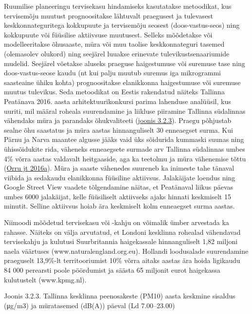 \documentclass[estonian,]{article}
\begin{document}
Ruumilise planeeringu tervisekasu hindamiseks kasutatakse metoodikat, kus tervisemõju muutust prognoositakse lähtuvalt praegusest ja tulevasest keskkonnateguritega kokkupuute ja tervisemõju seosest (doos-vastus-seos) ning kokkupuute või füüsilise aktiivsuse muutusest. Selleks mõõdetakse või modelleeritakse õhusaaste, müra või muu taolise keskkonnateguri tasemed (olemasolev olukord) ning seejärel luuakse erinevate tulevikustsenaariumide mudelid. Seejärel võetakse aluseks praeguse haigestumuse või suremuse tase ning doos-vastus-seose kaudu (nt kui palju muutub suremus iga mikrogrammi saasteaine ühiku kohta) prognoositakse elanikkonna haigestumuse või suremuse muutus tulevikus.
Seda metoodikat on Eestis rakendatud näiteks Tallinna Peatänava 2016. aasta arhitektuurikonkursi parima lahenduse analüüsil, kus uuriti, mil määral roheala suurendamine ja liikluse piiramine Tallinna südalinnas vähendaks müra ja parandaks õhukvaliteeti (\protect\hyperlink{figure323}{joonis 3.2.3}). Praegu põhjustab sealne õhu saastatus ja müra aastas hinnanguliselt 30 enneaegset surma. Kui Pärnu ja Narva maantee algusse jääks vaid üks sõidurida kummaski suunas ning ühissõidukite rida, väheneks enneaegsete surmade arv Tallinna südalinnas umbes 4\% võrra aastas valdavalt heitgaaside, aga ka teetolmu ja müra vähenemise tõttu (\protect\hyperlink{Orru2016}{Orru jt 2016a}). Müra ja saaste vähenedes suureneb ka inimeste tahe tänaval viibida ja sedakaudu elanikkonna füüsiline aktiivsus. Jalakäijate loendus ning Google Street View vaadete tõlgendamine näitas, et Peatänaval liikus päevas umbes 6000 jalakäijat, kelle füüsiliselt aktiivseks ajaks hinnati keskmiselt 15 minutit. Selline aktiivsus hoiab ära keskmiselt kolm enneaegset surma aastas.

Niimoodi mõõdetud tervisekasu või -kahju on võimalik ümber arvestada ka rahasse. Näiteks on välja arvutatud, et Londoni kesklinna rohealad vähendavad tervisekahju ja kulutusi Suurbritannia haigekassale hinnanguliselt 1,82 miljoni naela väärtuses (www.naturalengland.org.eu). Hollandi loodusalade suurendamine praeguselt 13,9\%-lt territooriumist 10\% võrra aitaks aastas ära hoida ligikaudu 84 000 perearsti poole pöördumist ja säästa 65 miljonit eurot haigekassa kulutustelt (www.kpmg.nl).

{Joonis 3.2.3.} Tallinna kesklinna peenosakeste (PM10) aasta keskmine sisaldus (μg/m3) ja müratasemed (dB(A)) päeval (Ld 7.00--23.00)
\end{document}
